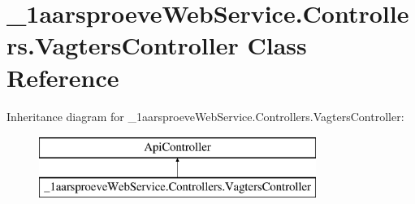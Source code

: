 \hypertarget{class__1aarsproeve_web_service_1_1_controllers_1_1_vagters_controller}{}\section{\+\_\+1aarsproeve\+Web\+Service.\+Controllers.\+Vagters\+Controller Class Reference}
\label{class__1aarsproeve_web_service_1_1_controllers_1_1_vagters_controller}
Inheritance diagram for \+\_\+1aarsproeve\+Web\+Service.\+Controllers.\+Vagters\+Controller\+:\begin{figure}[H]
\begin{center}
\leavevmode
\includegraphics[height=2.000000cm]{class__1aarsproeve_web_service_1_1_controllers_1_1_vagters_controller}
\end{center}
\end{figure}
